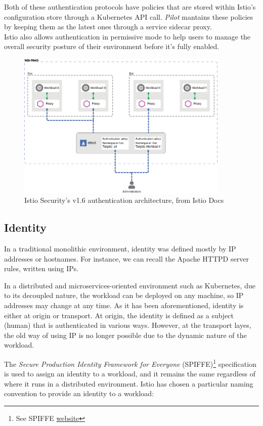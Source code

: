 \noindent Both of these authentication protocols have policies that are stored within Istio's configuration store through a Kubernetes API call. \textit{Pilot} mantains these policies by keeping them as the latest ones through a service sidecar proxy. \\Istio also allows authentication in permissive mode to help users to manage the overall security posture of their environment before it's fully enabled.    

\begin{figure}[ht]
    \centering
    \includegraphics[width=0.9\textwidth]{chapters/images/chp2/arch-auth.png}
    \caption{Istio Security's v1.6 authentication architecture, from Istio Docs}
    \label{fig:autharc}
\end{figure}

\subsection{Identity}
In a traditional monolithic environment, identity was defined mostly by IP addresses or hostnames. For instance, we can recall the Apache HTTPD server rules, written using IPs.

In a distributed and microservices-oriented environment such as Kubernetes, due to its decoupled nature, the workload can be deployed on any machine, so IP addresses may change at any time. As it has been aforementioned, identity is either at origin or transport. At origin, the identity is defined as a subject (human) that is authenticated in various ways. However, at the transport layes, the old way of using IP is no longer possible due to the dynamic nature of the workload.

The \textit{Secure Production Identity Framework for Everyone} (SPIFFE)\footnote{See SPIFFE \href{https://spiffe.io/}{website}} specification is used to assign an identity to a workload, and it remains the same regardless of where it runs in a distributed environment. Istio has chosen a particular naming convention to provide an identity to a workload:


